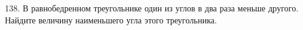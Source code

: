 138. В равнобедренном треугольнике один из углов в два раза меньше другого. Найдите величину наименьшего угла этого треугольника.\\
